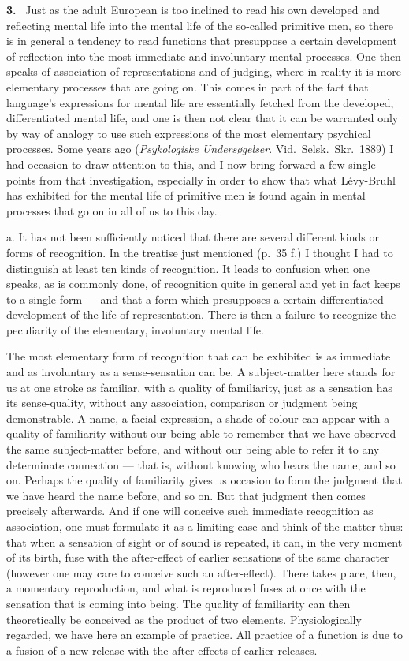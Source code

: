 \documentclass[12pt]{book}
\newcommand{\hnum}[1]{\noindent\textbf{#1.}~}
\newcommand{\opage}[1]{\marginnote{\footnotesize\textit{[#1]}}}
\begin{document}
\hnum{3} Just as the adult European is too inclined to read his own developed
and reflecting mental life into the mental life of the so-called primitive men,
so there is in general a tendency to read functions that presuppose a certain
development of reflection into the most immediate and involuntary mental
processes. One then speaks of association of representations and of judging,
where in reality it is more elementary processes that are going on. This comes
in part of the fact that language's expressions for mental life are essentially
fetched from the developed, differentiated mental life, and one is then not
clear that it can be warranted only by way of analogy to use such expressions of
the most elementary psychical processes. Some years ago (\textit{Psykologiske
Undersøgelser}. Vid.\ Selsk.\ Skr.\ 1889) I had occasion to draw attention to
this, and I now bring forward a few single points from that investigation,
especially in order to show that what Lévy-Bruhl has exhibited for the mental
life of primitive men is found again in mental processes that go on in all of us
to this day.

a. It has not been sufficiently noticed that there are several different kinds
or forms of recognition. In the treatise just mentioned (p.\ 35 f.) I thought I
had to distinguish at least ten kinds of recognition. \opage{17}It leads to confusion when
one speaks, as is commonly done, of recognition quite in general and yet in fact
keeps to a single form --- and that a form which presupposes a certain
differentiated development of the life of representation. There is then a
failure to recognize the peculiarity of the elementary, involuntary mental life.

The most elementary form of recognition that can be exhibited is as immediate
and as involuntary as a sense-sensation can be. A subject-matter here stands for
us at one stroke as familiar, with a quality of familiarity, just as a sensation
has its sense-quality, without any association, comparison or judgment being
demonstrable. A name, a facial expression, a shade of colour can appear with a
quality of familiarity without our being able to remember that we have observed
the same subject-matter before, and without our being able to refer it to any
determinate connection --- that is, without knowing who bears the name, and so
on. Perhaps the quality of familiarity gives us occasion to form the judgment
that we have heard the name before, and so on. But that judgment then comes
precisely afterwards. And if one will conceive such immediate recognition as
association, one must formulate it as a limiting case and think of the matter
thus: that when a sensation of sight or of sound is repeated, it can, in the
very moment of its birth, fuse with the after-effect of earlier sensations of
the same character (however one may care to conceive such an after-effect).
There takes place, then, a momentary reproduction, and what is reproduced fuses
at once with the sensation that is coming into being. The quality of familiarity
can then theoretically be conceived as the product of two elements.
Physiologically regarded, we have here an example of practice. All practice of a
function \opage{18}is due to a fusion of a new release with the after-effects of earlier
releases.
\end{document}
